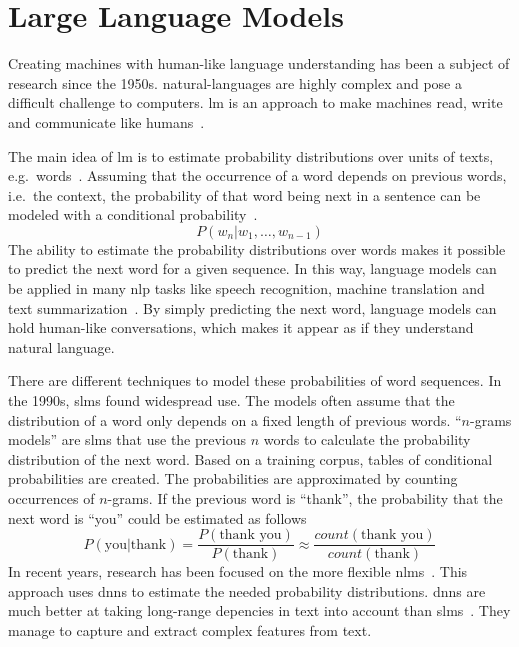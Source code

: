 \chapter{Large Language Models}\label{ch:techOverview}

Creating machines with human-like language understanding has been a subject of research since the 1950s.
\gls{natural-language}s are highly complex and pose a difficult challenge to computers.
\gls{lm} is an approach to make machines read, write and communicate like humans~\autocite{zhao2023survey}.

The main idea of \gls{lm} is to estimate probability distributions over units of texts, e.g.\ words~\autocite{de2015survey}.
Assuming that the occurrence of a word depends on previous words, i.e.\ the context, the probability of that word being next in a sentence can be modeled with a conditional probability~\autocite{jozefowicz2016exploring}.
\[
    P(w_n | w_1, \dots , w_{n-1})
\]
The ability to estimate the probability distributions over words makes it possible to predict the next word for a given sequence.
In this way, language models can be applied in many \gls{nlp} tasks like speech recognition, machine translation and text summarization~\autocite{jozefowicz2016exploring}.
By simply predicting the next word, language models can hold human-like conversations, which makes it appear as if they understand natural language.

There are different techniques to model these probabilities of word sequences.
In the 1990s, \glspl{slm} found widespread use.
The models often assume that the distribution of a word only depends on a fixed length of previous words.
\enquote{$n$-grams models} are \glspl{slm} that use the previous $n$ words to calculate the probability distribution of the next word.
Based on a training corpus, tables of conditional probabilities are created.
The probabilities are approximated by counting occurrences of $n$-grams.
If the previous word is \enquote{thank}, the probability that the next word is \enquote{you} could be estimated as follows~\autocite{quadarLM2020}
\[
    P(\text{you} | \text{thank}) = \frac{P(\text{thank you})}{P(\text{thank})} \approx \frac{count(\text{thank you})}{count(\text{thank})}
\]
In recent years, research has been focused on the more flexible \glspl{nlm}~\autocite{quadarLM2020}.
This approach uses \glspl{dnn} to estimate the needed probability distributions.
\glspl{dnn} are much better at taking long-range depencies in text into account than \glspl{slm}~\autocite{Hadi_2023}.
They manage to capture and extract complex features from text.

